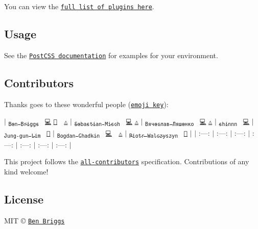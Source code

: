 You can view the \href{https://github.com/svg/svgo/tree/master/plugins}{\tt full list of plugins here}.

\subsection*{Usage}

See the \href{https://github.com/postcss/postcss#usage}{\tt Post\+C\+SS documentation} for examples for your environment.

\subsection*{Contributors}

Thanks goes to these wonderful people (\href{https://github.com/kentcdodds/all-contributors#emoji-key}{\tt emoji key})\+:

$\vert$ \href{http://beneb.info}{\tt \textsubscript{Ben Briggs}}~\newline
\href{https://github.com/ben-eb/postcss-svgo/commits?author=ben-eb}{\tt 💻} \href{https://github.com/ben-eb/postcss-svgo/commits?author=ben-eb}{\tt 📖} 👀 \href{https://github.com/ben-eb/postcss-svgo/commits?author=ben-eb}{\tt ⚠️} $\vert$ \href{https://sebastian-misch.de}{\tt \textsubscript{Sebastian Misch}}~\newline
\href{https://github.com/ben-eb/postcss-svgo/commits?author=sbstnmsch}{\tt 💻} \href{https://github.com/ben-eb/postcss-svgo/commits?author=sbstnmsch}{\tt ⚠️} $\vert$ \href{https://github.com/ophyros}{\tt \textsubscript{Вячеслав Ляшенко}}~\newline
\href{https://github.com/ben-eb/postcss-svgo/commits?author=ophyros}{\tt 💻} \href{https://github.com/ben-eb/postcss-svgo/commits?author=ophyros}{\tt ⚠️} $\vert$ \href{https://shinnn.github.io}{\tt \textsubscript{shinnn}}~\newline
\href{https://github.com/ben-eb/postcss-svgo/commits?author=shinnn}{\tt 💻} $\vert$ \href{https://github.com/j6lim}{\tt \textsubscript{Jung-\/gun Lim}}~\newline
\href{https://github.com/ben-eb/postcss-svgo/issues?q=author%3Aj6lim}{\tt 🐛} $\vert$ \href{https://github.com/TrySound}{\tt \textsubscript{Bogdan Chadkin}}~\newline
\href{https://github.com/ben-eb/postcss-svgo/commits?author=TrySound}{\tt 💻} 👀 \href{https://github.com/ben-eb/postcss-svgo/commits?author=TrySound}{\tt ⚠️} $\vert$ \href{http://outof.me}{\tt \textsubscript{Piotr Walczyszyn}}~\newline
\href{https://github.com/ben-eb/postcss-svgo/issues?q=author%3Apwalczyszyn}{\tt 🐛} $\vert$ $\vert$ \+:---\+: $\vert$ \+:---\+: $\vert$ \+:---\+: $\vert$ \+:---\+: $\vert$ \+:---\+: $\vert$ \+:---\+: $\vert$ \+:---\+: $\vert$

This project follows the \href{https://github.com/kentcdodds/all-contributors}{\tt all-\/contributors} specification. Contributions of any kind welcome!

\subsection*{License}

M\+IT © \href{http://beneb.info}{\tt Ben Briggs} 